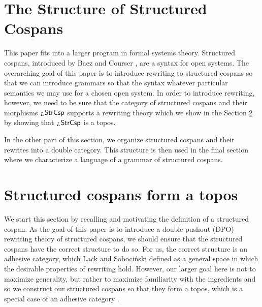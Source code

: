 \documentclass{amsart}
\begin{document}
\section{The Structure of Structured Cospans}
\label{sec:StructureOfStrCsp}


This paper fits into a larger program in formal systems
theory. Structured cospans, introduced by Baez and Courser
\cite{bc_strCsp}, are a syntax for open systems. The
overarching goal of this paper is to introduce rewriting to
structured cospans so that we can introduce grammars so that
the syntax whatever particular semantics we may use for a
chosen open system.  In order to introduce rewriting,
however, we need to be sure that the category of structured
cospans and their morphisms $ _L\mathsf{StrCsp} $ supports a
rewriting theory which we show in the Section
\ref{sec:StructureOfStrCsp} by showing that $ _L\mathsf{StrCsp} $ is
a topos.

In the other part of this section, we organize structured
cospans and their rewrites into a double category.  This
structure is then used in the final section where we
characterize a language of a grammar of structured cospans.

\section{Structured cospans form a topos}
\label{sec:StructureOfStrCsp}

We start this section by recalling and motivating the
definition of a structured cospan.  As the goal of this
paper is to introduce a double pushout (DPO) rewriting
theory of structured cospans, we should ensure that the
structured cospans have the correct structure to do so. For
us, the correct structure is an adhesive category, which
Lack and Soboci\'{n}ski \cite{LackSobo_Adhesive} defined as
a general space in which the desirable properties of
rewriting hold. However, our larger goal here is not to
maximize generality, but rather to maximize familiarity with
the ingredients and so we construct our structured cospans
so that they form a topos, which is a special case of an
adhesive category \cite{LackSobo_TopsIsAdh}.
\end{document}
